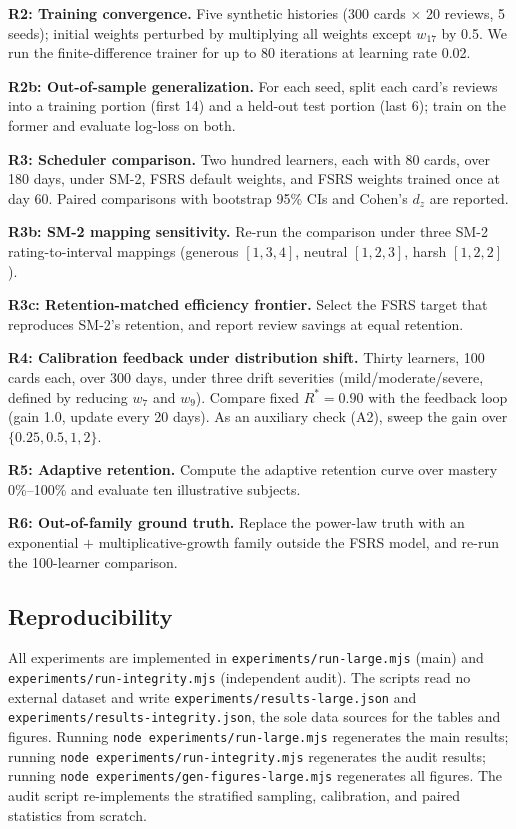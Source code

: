 \documentclass[conference]{IEEEtran}
\begin{document}
\textbf{R2: Training convergence.} Five synthetic histories (300 cards $\times$ 20 reviews, 5 seeds); initial weights perturbed by multiplying all weights except $w_{17}$ by 0.5. We run the finite-difference trainer for up to 80 iterations at learning rate 0.02.

\textbf{R2b: Out-of-sample generalization.} For each seed, split each card's reviews into a training portion (first 14) and a held-out test portion (last 6); train on the former and evaluate log-loss on both.

\textbf{R3: Scheduler comparison.} Two hundred learners, each with 80 cards, over 180 days, under SM-2, FSRS default weights, and FSRS weights trained once at day 60. Paired comparisons with bootstrap 95\% CIs and Cohen's $d_z$ are reported.

\textbf{R3b: SM-2 mapping sensitivity.} Re-run the comparison under three SM-2 rating-to-interval mappings (generous $[1,3,4]$, neutral $[1,2,3]$, harsh $[1,2,2]$).

\textbf{R3c: Retention-matched efficiency frontier.} Select the FSRS target that reproduces SM-2's retention, and report review savings at equal retention.

\textbf{R4: Calibration feedback under distribution shift.} Thirty learners, 100 cards each, over 300 days, under three drift severities (mild/moderate/severe, defined by reducing $w_7$ and $w_9$). Compare fixed $R^*=0.90$ with the feedback loop (gain 1.0, update every 20 days). As an auxiliary check (A2), sweep the gain over $\{0.25, 0.5, 1, 2\}$.

\textbf{R5: Adaptive retention.} Compute the adaptive retention curve over mastery 0\%--100\% and evaluate ten illustrative subjects.

\textbf{R6: Out-of-family ground truth.} Replace the power-law truth with an exponential $+$ multiplicative-growth family outside the FSRS model, and re-run the 100-learner comparison.

\subsection{Reproducibility}

All experiments are implemented in \texttt{experiments/run-large.mjs} (main) and \texttt{experiments/run-integrity.mjs} (independent audit). The scripts read no external dataset and write \texttt{experiments/results-large.json} and \texttt{experiments/results-integrity.json}, the sole data sources for the tables and figures. Running \texttt{node experiments/run-large.mjs} regenerates the main results; running \texttt{node experiments/run-integrity.mjs} regenerates the audit results; running \texttt{node experiments/gen-figures-large.mjs} regenerates all figures. The audit script re-implements the stratified sampling, calibration, and paired statistics from scratch.
\end{document}
